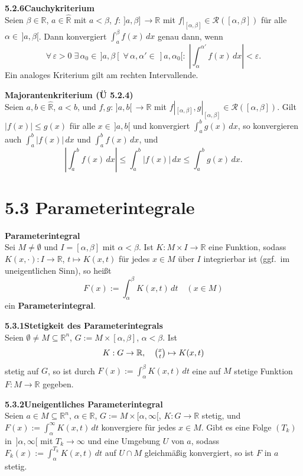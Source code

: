 \documentclass[a4paper,12pt]{article}
\newcommand{\gentry}[3]{%
  \noindent\textbf{#1\quad #2}\nopagebreak\\[0.2em]
  #3\par\smallskip
}
\begin{document}
\gentry{5.2.6}{Cauchykriterium}{%
  Seien $\beta \in \mathbb{R}$, $a \in \widehat{\mathbb{R}}$ mit $a < \beta$,
  $f: \,]a, \beta]\, \to \mathbb{R}$ mit $f|_{[\alpha, \beta]} \in \mathcal{R}([\alpha, \beta])$
  für alle $\alpha \in\,]a, \beta[$. Dann konvergiert $\int_a^\beta f(x)\,dx$
  genau dann, wenn
  \[
    \forall\, \varepsilon > 0\; \exists\, \alpha_0 \in\,]a,\beta[\;
    \forall\, \alpha, \alpha' \in\,]a, \alpha_0[:\;
    \left|\int_\alpha^{\alpha'} f(x)\,dx\right| < \varepsilon.
  \]
  Ein analoges Kriterium gilt am rechten Intervallende.
}

\gentry{}{Majorantenkriterium (Ü 5.2.4)}{%
  Seien $a, b \in \widehat{\mathbb{R}}$, $a<b$, und $f, g: \,]a,b[\, \to \mathbb{R}$
  mit $f|_{[\alpha,\beta]}, g|_{[\alpha,\beta]} \in \mathcal{R}([\alpha,\beta])$.
  Gilt $|f(x)| \leq g(x)$ für alle $x \in\,]a,b[$ und konvergiert $\int_a^b g(x)\,dx$,
  so konvergieren auch $\int_a^b |f(x)|\,dx$ und $\int_a^b f(x)\,dx$, und
  \[
    \left|\int_a^b f(x)\,dx\right| \leq \int_a^b |f(x)|\,dx \leq \int_a^b g(x)\,dx.
  \]
}

\section*{5.3 \quad Parameterintegrale}

\gentry{}{Parameterintegral}{%
  Sei $M \neq \emptyset$ und $I = [\alpha, \beta]$ mit $\alpha < \beta$. Ist
  $K: M \times I \to \mathbb{R}$ eine Funktion, sodass $K(x, \cdot): I \to \mathbb{R}$,
  $t \mapsto K(x,t)$ für jedes $x \in M$ über $I$ integrierbar ist (ggf.\ im
  uneigentlichen Sinn), so heißt
  \[
    F(x) := \int_\alpha^\beta K(x,t)\,dt \quad (x \in M)
  \]
  ein \textbf{Parameterintegral}.
}

\gentry{5.3.1}{Stetigkeit des Parameterintegrals}{%
  Seien $\emptyset \neq M \subseteq \mathbb{R}^n$, $G := M \times [\alpha, \beta]$,
  $\alpha < \beta$. Ist
  \[
    K: G \to \mathbb{R}, \quad \tbinom{x}{t} \mapsto K(x,t)
  \]
  stetig auf $G$, so ist durch $F(x) := \int_\alpha^\beta K(x,t)\,dt$ eine auf
  $M$ stetige Funktion $F: M \to \mathbb{R}$ gegeben.
}

\gentry{5.3.2}{Uneigentliches Parameterintegral}{%
  Seien $a \in M \subseteq \mathbb{R}^n$, $\alpha \in \mathbb{R}$, $G := M \times [\alpha, \infty[$,
  $K: G \to \mathbb{R}$ stetig, und $F(x) := \int_\alpha^\infty K(x,t)\,dt$
  konvergiere für jedes $x \in M$. Gibt es eine Folge $(T_k)$ in $\,]\alpha, \infty[$
  mit $T_k \to \infty$ und eine Umgebung $U$ von $a$, sodass
  $F_k(x) := \int_\alpha^{T_k} K(x,t)\,dt$ auf $U \cap M$ gleichmäßig konvergiert,
  so ist $F$ in $a$ stetig.
}
\end{document}
